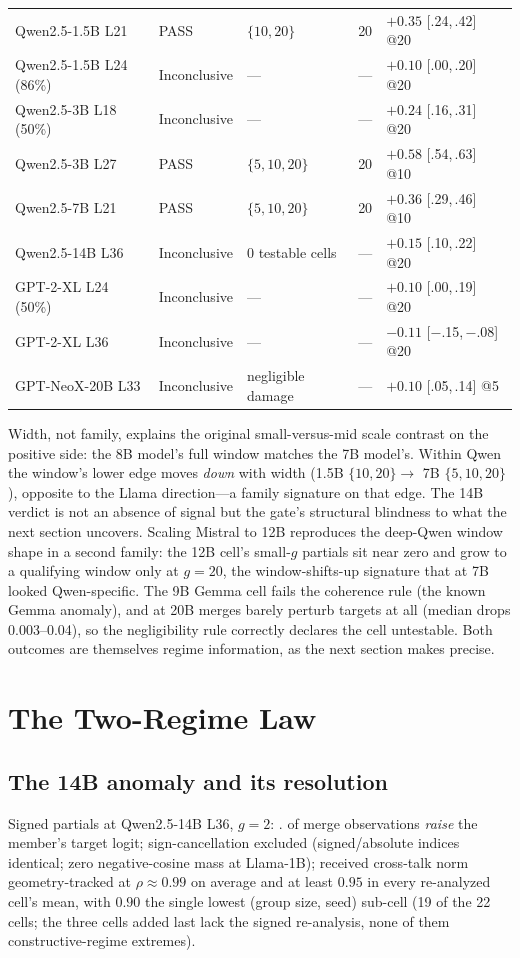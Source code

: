 \documentclass[preprint,12pt]{elsarticle}
\theoremstyle{definition}
\begin{document}
\begin{table}[htbp]
{\begin{tabular}{lllll}
Qwen2.5-1.5B L21 & PASS & $\{10,20\}$ & 20 & $+0.35$ {\scriptsize[.24,\,.42]} @20 \\
Qwen2.5-1.5B L24 (86\%) & Inconclusive & --- & --- & $+0.10$ {\scriptsize[.00,\,.20]} @20 \\
Qwen2.5-3B L18 (50\%) & Inconclusive & --- & --- & $+0.24$ {\scriptsize[.16,\,.31]} @20 \\
Qwen2.5-3B L27 & PASS & $\{5,10,20\}$ & 20 & $+0.58$ {\scriptsize[.54,\,.63]} @10 \\
Qwen2.5-7B L21   & PASS & $\{5,10,20\}$ & 20 & $+0.36$ {\scriptsize[.29,\,.46]} @10 \\
Qwen2.5-14B L36  & Inconclusive & 0 testable cells & --- & $+0.15$ {\scriptsize[.10,\,.22]} @20 \\
GPT-2-XL L24 (50\%) & Inconclusive & --- & --- & $+0.10$ {\scriptsize[.00,\,.19]} @20 \\
GPT-2-XL L36 & Inconclusive & --- & --- & $-0.11$ {\scriptsize[$-$.15,\,$-$.08]} @20 \\
GPT-NeoX-20B L33 & Inconclusive & negligible damage & --- & $+0.10$ {\scriptsize[.05,\,.14]} @5 \\
\bottomrule
\end{tabular}
}
\end{table}

Width, not family, explains the original small-versus-mid scale contrast on the positive
side: the 8B model's full window matches the 7B model's. Within Qwen the window's lower edge
moves \emph{down} with width (1.5B $\{10,20\}\to$ 7B $\{5,10,20\}$), opposite to the Llama
direction---a family signature on that edge. The 14B verdict is not an absence of signal but
the gate's structural blindness to what the next section uncovers. Scaling Mistral to 12B
reproduces the deep-Qwen window shape in a second family: the 12B cell's small-$g$ partials
sit near zero and grow to a qualifying window only at $g{=}20$, the window-shifts-up
signature that at 7B looked Qwen-specific. The 9B Gemma cell fails the coherence rule (the
known Gemma anomaly), and at 20B merges barely perturb targets at all (median drops
0.003--0.04), so the negligibility rule correctly declares the cell untestable. Both
outcomes are themselves regime information, as the next section makes precise.

\section{The Two-Regime Law}\label{sec:law}
\subsection{The 14B anomaly and its resolution}
Signed partials at Qwen2.5-14B L36, $g{=}2$: \fourteenBPartialsGtwo{}.
\fourteenBConstructiveRange{} of merge observations \emph{raise} the member's target
logit; sign-cancellation excluded (signed/absolute indices identical; zero
negative-cosine mass at Llama-1B); received cross-talk norm geometry-tracked at
$\rho\approx0.99$ on average and at least $0.95$ in every re-analyzed cell's mean, with
$0.90$ the single lowest (group size, seed) sub-cell (19 of the 22 cells; the three cells
added last lack the signed re-analysis, none of them constructive-regime extremes).
\end{document}
